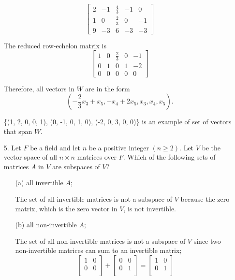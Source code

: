 \documentclass{article}
\begin{document}
\begin{enumerate}[listparindent=\parindent]
\[
    \begin{bmatrix}
        2 & -1 & \frac{4}{3} & -1 & 0 \\
        1 & 0 & \frac{2}{3} & 0 & -1 \\
        9 & -3 & 6 & -3 & -3
    \end{bmatrix}
\]

The reduced row-echelon matrix is
\[
    \begin{bmatrix}
        1 & 0 & \frac{2}{3} & 0 & -1 \\
        0 & 1 & 0 & 1 & -2 \\
        0 & 0 & 0 & 0 & 0
    \end{bmatrix}
\]

Therefore, all vectors in \(W\) are in the form
\[ (-\frac{2}{3}x_3 + x_5, -x_4 + 2x_5, x_3, x_4, x_5). \]

\{(1, 2, 0, 0, 1), (0, -1, 0, 1, 0), (-2, 0, 3, 0, 0)\} 
is an example of set of vectors that span \(W\).

\item[5.] Let \(F\) be a field and let \(n\) be a positive integer \((n \geq 2)\).
    Let \(V\) be the vector space of all \(n \times n\) matrices over \(F\).
    Which of the following sets of matrices \(A\) in \(V\) are subspaces of \(V\)?
    \begin{enumerate}[listparindent=\parindent]
        \item[(a)] all invertible \(A\);

            The set of all invertible matrices is not a subspace of \(V\)
            because the zero matrix, which is the zero vector in \(V\), is not invertible.

        \item[(b)] all non-invertible \(A\);

            The set of all non-invertible matrices is not a subspace of \(V\)
            since two non-invertible matrices can sum to an invertible matrix;
            \[
                \begin{bmatrix}
                    1 & 0 \\
                    0 & 0 \\
                \end{bmatrix}
                +
                \begin{bmatrix}
                    0 & 0 \\
                    0 & 1 \\
                \end{bmatrix}
                =
                \begin{bmatrix}
                    1 & 0 \\
                    0 & 1 \\
                \end{bmatrix}
            \]


\end{enumerate}
\end{enumerate}
\end{document}
